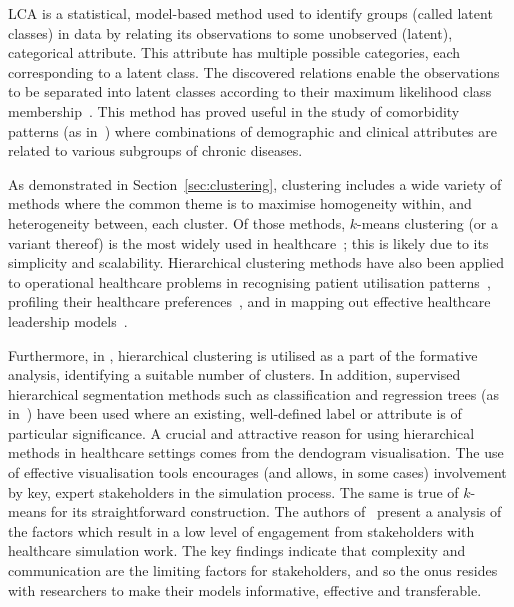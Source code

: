 LCA is a statistical, model-based method used to identify groups (called latent
classes) in data by relating its observations to some unobserved (latent),
categorical attribute. This attribute has multiple possible categories, each
corresponding to a latent class. The discovered relations enable the
observations to be separated into latent classes according to their maximum
likelihood class membership~\cite{Hagenaars2002,Lazarsfeld1968}. This method has
proved useful in the study of comorbidity patterns (as
in~\cite{Kuwornu2014,Larsen2017}) where combinations of demographic and clinical
attributes are related to various subgroups of chronic diseases.

As demonstrated in Section~\ref{sec:clustering}, clustering includes a wide
variety of methods where the common theme is to maximise homogeneity within, and
heterogeneity between, each cluster. Of those methods, \(k\)-means clustering
(or a variant thereof) is the most widely used in
healthcare~\cite{%
    Elbattah2017,Haraty2015,Ogbuabor2018,Santhi2010,Silitonga2018,Vuik2016a%
}; this is likely due to its simplicity and scalability. Hierarchical clustering
methods have also been applied to operational healthcare problems in recognising
patient utilisation patterns~\cite{Zayas2016}, profiling their healthcare
preferences~\cite{Liu2009}, and in mapping out effective healthcare leadership
models~\cite{Hargett2017}.

Furthermore, in \cite{Vuik2016a}, hierarchical clustering is utilised as a part
of the formative analysis, identifying a suitable number of clusters. In
addition, supervised hierarchical segmentation methods such as classification
and regression trees (as in~\cite{Harper2006,Kumar2019}) have been used where an
existing, well-defined label or attribute is of particular significance. A
crucial and attractive reason for using hierarchical methods in healthcare
settings comes from the dendogram visualisation. The use of effective
visualisation tools encourages (and allows, in some cases) involvement by key,
expert stakeholders in the simulation process. The same is true of \(k\)-means
for its straightforward construction. The authors of~\cite{Jahangirian2015}
present a analysis of the factors which result in a low level of engagement from
stakeholders with healthcare simulation work. The key findings indicate that
complexity and communication are the limiting factors for stakeholders, and so
the onus resides with researchers to make their models informative, effective
and transferable.

